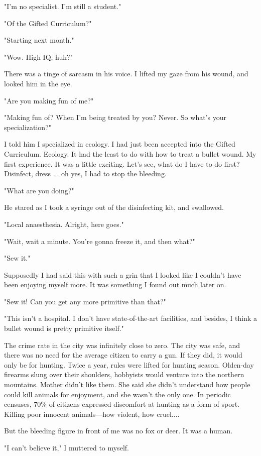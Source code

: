 "I'm no specialist. I'm still a student."

"Of the Gifted Curriculum?"

"Starting next month."

"Wow. High IQ, huh?"

There was a tinge of sarcasm in his voice. I lifted my gaze from his
wound, and looked him in the eye.

"Are you making fun of me?"

"Making fun of? When I'm being treated by you? Never. So what's your
specialization?"

I told him I specialized in ecology. I had just been accepted into the
Gifted Curriculum. Ecology. It had the least to do with how to treat a
bullet wound. My first experience. It was a little exciting. Let's see,
what do I have to do first? Disinfect, dress ... oh yes, I had to stop
the bleeding.

"What are you doing?"

He stared as I took a syringe out of the disinfecting kit, and
swallowed.

"Local anaesthesia. Alright, here goes."

"Wait, wait a minute. You're gonna freeze it, and then what?"

"Sew it."

Supposedly I had said this with such a grin that I looked like I
couldn't have been enjoying myself more. It was something I found out
much later on.

"Sew it! Can you get any more primitive than that?"

"This isn't a hospital. I don't have state-of-the-art facilities, and
besides, I think a bullet wound is pretty primitive itself."

The crime rate in the city was infinitely close to zero. The city was
safe, and there was no need for the average citizen to carry a gun. If
they did, it would only be for hunting. Twice a year, rules were lifted
for hunting season. Olden-day firearms slung over their shoulders,
hobbyists would venture into the northern mountains. Mother didn't like
them. She said she didn't understand how people could kill animals for
enjoyment, and she wasn't the only one. In periodic censuses, 70\% of
citizens expressed discomfort at hunting as a form of sport. Killing
poor innocent animals―how violent, how cruel....

But the bleeding figure in front of me was no fox or deer. It was a
human.

"I can't believe it," I muttered to myself.

